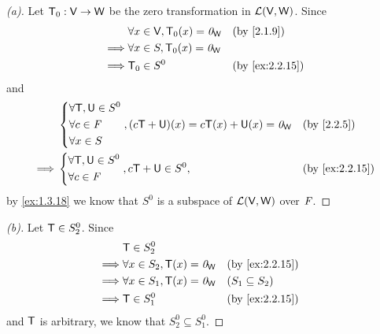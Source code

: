 \begin{proof}[(a)]
  Let \(\mathsf{T}_0 : \mathsf{V} \to \mathsf{W}\) be the zero transformation in \(\mathcal{L}(\mathsf{V}, \mathsf{W})\).
  Since
  \begin{align*}
             & \forall x \in \V, \zT(x) = \zv_{\W} &  & \by{2.1.9}     \\
    \implies & \forall x \in S, \zT(x) = \zv_{\W}                      \\
    \implies & \zT \in S^0                         &  & \by{ex:2.2.15}
  \end{align*}
  and
  \begin{align*}
             & \begin{dcases}
                 \forall \T, \U \in S^0 \\
                 \forall c \in \F       \\
                 \forall x \in S
               \end{dcases}, (c\T + \U)(x) = c \T(x) + \U(x) = \zv_{\W} &  & \by{2.2.5}     \\
    \implies & \begin{dcases}
                 \forall \T, \U \in S^0 \\
                 \forall c \in \F
               \end{dcases}, c\T + \U \in S^0,                          &  & \by{ex:2.2.15}
  \end{align*}
  by \cref{ex:1.3.18} we know that \(S^0\) is a subspace of \(\mathcal{L}(\mathsf{V}, \mathsf{W})\) over \(\mathit{F}\).
\end{proof}

\begin{proof}[(b)]
  Let \(\mathsf{T} \in S_2^0\).
  Since
  \begin{align*}
             & \T \in S_2^0                                                 \\
    \implies & \forall x \in S_2, \T(x) = \zv_{\W} &  & \by{ex:2.2.15}      \\
    \implies & \forall x \in S_1, \T(x) = \zv_{\W} &  & (S_1 \subseteq S_2) \\
    \implies & \T \in S_1^0                        &  & \by{ex:2.2.15}
  \end{align*}
  and \(\mathsf{T}\) is arbitrary, we know that \(S_2^0 \subseteq S_1^0\).
\end{proof}

